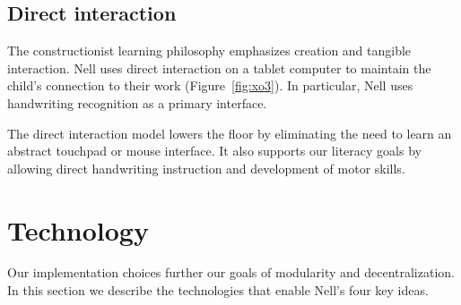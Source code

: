 \documentclass{sig-alternate}
\begin{document}




\subsection{Direct interaction}


The constructionist learning philosophy emphasizes creation and
tangible interaction.  Nell uses direct interaction on a tablet
computer to maintain the child's connection to their work
(Figure~\ref{fig:xo3}).  In particular, Nell uses handwriting
recognition as a primary interface.

The direct interaction model lowers the floor by eliminating the need
to learn an abstract touchpad or mouse interface.  It also supports
our literacy goals by allowing direct handwriting instruction and
development of motor skills.

\section{Technology}

Our implementation choices further our goals of modularity and
decentralization.  In this
section we describe the technologies that enable Nell's four key ideas.
\end{document}
